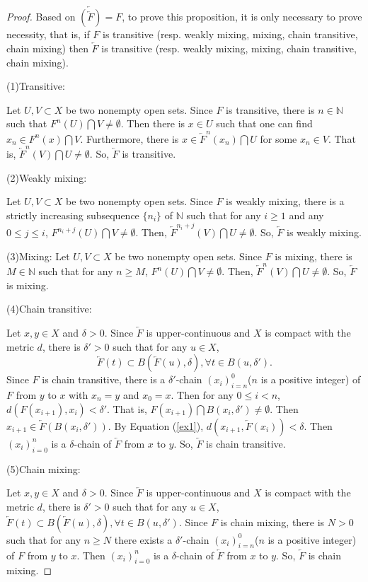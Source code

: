 \documentclass[10pt,a4paper]{amsart}
\begin{document}
\begin{proof}
	{Based on $\underleftarrow{(\underleftarrow{F})}=F$, to prove this proposition, it is only necessary to prove necessity, that is, if $F$ is transitive (resp. {weakly mixing, mixing, chain transitive, chain mixing}) then $\underleftarrow{F}$ is transitive (resp. {weakly mixing, mixing, chain transitive, chain mixing}).}
	
	(1)Transitive: 
	
	{Let $U,V\subset X$ be two nonempty open sets. Since $F$ is transitive, there is $n\in\mathbb{N}$ such that $F^n(U)\bigcap V\neq\emptyset$. Then there is $x\in U$ such that one can find  $x_n\in F^n(x)\bigcap V$. Furthermore, there is $x\in\underleftarrow{F}^n(x_n)\bigcap U$ for some $x_n\in V$. That is, $\underleftarrow{F}^n(V)\bigcap U\neq\emptyset$. So, $\underleftarrow{F}$ is transitive.}
	
	(2)Weakly mixing:
	
	{Let $U,V\subset X$ be two nonempty open sets. Since $F$ is weakly mixing,  there is a strictly increasing subsequence $\{n_i\}$ of $\mathbb{N}$ such that for any $i\geq 1$ and any $0\leq j\leq i$, $F^{n_i+j}(U)\bigcap V\neq\emptyset$.
		Then,  $\underleftarrow{F}^{n_i+j}(V)\bigcap U\neq\emptyset$. So, $\underleftarrow{F}$ is weakly mixing.}
	
	(3)Mixing:
	Let $U,V\subset X$ be two nonempty open sets. Since $F$ is mixing, there is $M\in\mathbb{N}$ such that for any $n\geq M$, $F^{n}(U)\bigcap V\neq\emptyset$. Then, $\underleftarrow{F}^{n}(V)\bigcap U\neq\emptyset$. So, $\underleftarrow{F}$ is mixing.
	
	(4)Chain transitive:
	
	Let $x,y\in X$ and $\delta>0$. Since $\underleftarrow{F}$ is upper-continuous and $X$ is compact with the metric $d$, there is $\delta'>0$ such that for any $u\in X$, 
	\begin{equation}\label{ex1}
		\underleftarrow{F}(t)\subset B(\underleftarrow{F}(u),\delta), \forall t\in B(u,\delta').
	\end{equation}
	Since $F$ is chain transitive, there is a $\delta'$-chain $(x_i)^0_{i=n}$($n$ is a positive integer) of $F$ from $y$ to $x$ with $x_n=y$ and $x_0=x$. Then for any $0\leq i<n$, $d(F(x_{i+1}),x_{i})<\delta'$. That is, $F(x_{i+1})\bigcap B(x_i,\delta')\neq\emptyset$. Then $x_{i+1}\in\underleftarrow{F}(B(x_i,\delta'))$. By {Equation (\ref{ex1})}, $d(x_{i+1},\underleftarrow{F}(x_i))<\delta$. Then $(x_i)^n_{i=0}$ is a $\delta$-chain of $\underleftarrow{F}$ from $x$ to $y$. So, $\underleftarrow{F}$ is chain transitive.
	
	(5)Chain mixing:
	
	{Let $x,y\in X$ and $\delta>0$. Since $\underleftarrow{F}$ is upper-continuous and $X$ is compact with the metric $d$, there is $\delta'>0$ such that for any $u\in X$, $\underleftarrow{F}(t)\subset B(\underleftarrow{F}(u),\delta), \forall t\in B(u,\delta')$.
		Since $F$ is chain mixing, there is $N>0$ such that for any $n\geq N$ there exists a $\delta'$-chain $(x_i)^0_{i=n}$($n$ is a positive integer) of $F$ from $y$ to $x$. Then $(x_i)^n_{i=0}$ is a $\delta$-chain of $\underleftarrow{F}$ from $x$ to $y$. So, $\underleftarrow{F}$ is chain mixing.}
\end{proof}
\end{document}
